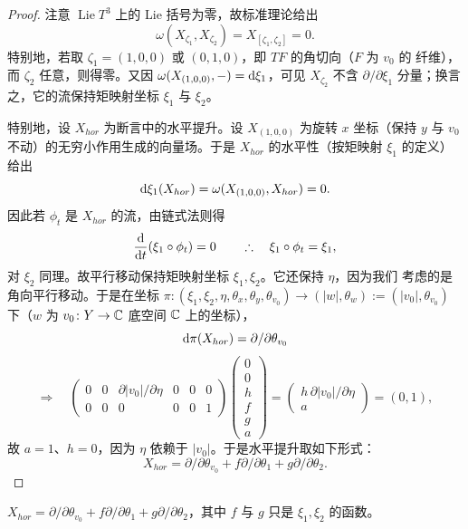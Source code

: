 \begin{proof}
注意 $\operatorname{Lie}T^3$ 上的 Lie 括号为零，故标准理论给出
\[
\omega(X_{\zeta_1},X_{\zeta_2})=X_{[\zeta_1,\zeta_2]}=0.
\]
特别地，若取 $\zeta_1=(1,0,0)$ 或 $(0,1,0)$，即 $TF$ 的角切向（$F$ 为 $v_0$ 的
纤维），而 $\zeta_2$ 任意，则得零。又因 $\omega(X_{(1,0,0)},-)=\mathrm{d}\xi_1$，可见
$X_{\zeta_2}$ 不含 $\partial/\partial\xi_1$ 分量；换言之，它的流保持矩映射坐标
$\xi_1$ 与 $\xi_2$。

特别地，设 $X_{hor}$ 为断言中的水平提升。设 $X_{(1,0,0)}$ 为旋转 $x$ 坐标（保持
$y$ 与 $v_0$ 不动）的无穷小作用生成的向量场。于是 $X_{hor}$ 的水平性（按矩映射
$\xi_1$ 的定义）给出
\[
\mathrm{d}\xi_1(X_{hor})=\omega(X_{(1,0,0)},X_{hor})=0.
\]
因此若 $\phi_t$ 是 $X_{hor}$ 的流，由链式法则得
\[
\frac{\mathrm{d}}{\mathrm{d} t}(\xi_1\circ\phi_t)=0
\qquad\therefore\quad \xi_1\circ\phi_t=\xi_1,
\]
对 $\xi_2$ 同理。故平行移动保持矩映射坐标 $\xi_1,\xi_2$。它还保持 $\eta$，因为我们
考虑的是角向平行移动。于是在坐标
$\pi\colon(\xi_1,\xi_2,\eta,\theta_x,\theta_y,\theta_{v_0})\to(|w|,\theta_w)
:=(|v_0|,\theta_{v_0})$ 下（$w$ 为 $v_0\colon Y\to\mathbb{C}$ 底空间 $\mathbb{C}$ 上的坐标），
\[
\mathrm{d}\pi(X_{hor})=\partial/\partial\theta_{v_0}
\]
\[
\Longrightarrow\quad
\begin{pmatrix}
0&0&\partial|v_0|/\partial\eta&0&0&0\\
0&0&0&0&0&1
\end{pmatrix}
\begin{pmatrix}0\\0\\h\\f\\g\\a\end{pmatrix}
=\begin{pmatrix}h\,\partial|v_0|/\partial\eta\\ a\end{pmatrix}=(0,1),
\]
故 $a=1$、$h=0$，因为 $\eta$ 依赖于 $|v_0|$。于是水平提升取如下形式：
\[
X_{hor}=\partial/\partial\theta_{v_0}+f\partial/\partial\theta_1
+g\partial/\partial\theta_2.
\]
\end{proof}

\begin{corollary}\label{cor:4-1-26}
$X_{hor}=\partial/\partial\theta_{v_0}+f\partial/\partial\theta_1
+g\partial/\partial\theta_2$，其中 $f$ 与 $g$ 只是 $\xi_1,\xi_2$ 的函数。
\end{corollary}

